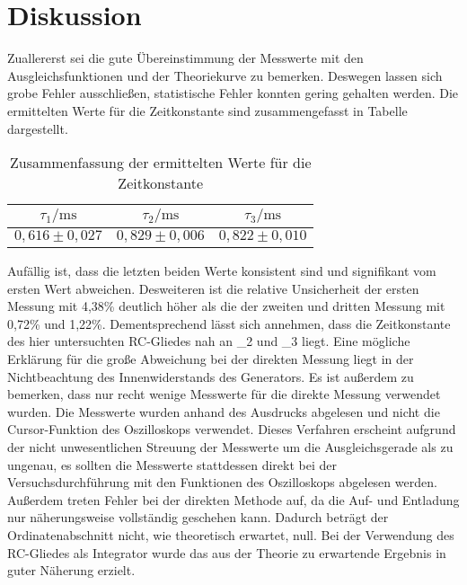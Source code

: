\section{Diskussion}
\label{sec:Diskussion}
Zuallererst sei die gute Übereinstimmung der Messwerte mit den Ausgleichsfunktionen
und der Theoriekurve zu bemerken. Deswegen lassen sich grobe Fehler ausschließen,
statistische Fehler konnten gering gehalten werden.
Die ermittelten Werte für die Zeitkonstante sind zusammengefasst in Tabelle
dargestellt.

\begin{table}
\centering
\begin{tabular}{ccc}
\toprule
$\tau_1 / \si{\milli \second}$ & $\tau_2 / \si{\milli \second}$ & $\tau_3 / \si{\milli \second}$\\
\midrule
$0,616 \pm 0,027$ & $0,829 \pm 0,006$ & $0,822 \pm 0,010$\\
\bottomrule
\end{tabular}
\caption{Zusammenfassung der ermittelten Werte für die Zeitkonstante}
\end{table}

Aufällig ist, dass die letzten beiden Werte konsistent sind und signifikant vom
ersten Wert abweichen. Desweiteren ist die relative Unsicherheit der ersten Messung mit
4,38\% deutlich höher als die der zweiten und dritten Messung mit 0,72\% und 1,22\%.
Dementsprechend lässt sich annehmen, dass die Zeitkonstante des hier untersuchten
RC-Gliedes nah an \tau_2 und \tau_3 liegt.
Eine mögliche Erklärung für die große Abweichung bei der direkten Messung liegt
in der Nichtbeachtung des Innenwiderstands des Generators. Es ist außerdem zu bemerken,
dass nur recht wenige Messwerte für die direkte Messung verwendet wurden. Die Messwerte
wurden anhand des Ausdrucks abgelesen und nicht die Cursor-Funktion des Oszilloskops verwendet.
Dieses Verfahren erscheint aufgrund der nicht unwesentlichen Streuung der Messwerte um die
Ausgleichsgerade als zu ungenau, es sollten die Messwerte stattdessen direkt bei der
Versuchsdurchführung mit den Funktionen des Oszilloskops abgelesen werden.
Außerdem treten Fehler bei der direkten Methode auf, da die Auf- und Entladung nur
näherungsweise vollständig geschehen kann. Dadurch beträgt der Ordinatenabschnitt nicht,
wie theoretisch erwartet, null.
Bei der Verwendung des RC-Gliedes als Integrator wurde das aus der Theorie zu erwartende Ergebnis
in guter Näherung erzielt.
